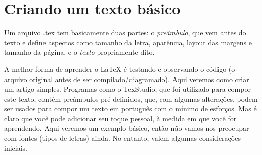 \documentclass[a4paper,nols,bidi]{tufte-book}
\begin{document}
\chapter{Criando um texto básico}

Um arquivo .tex tem basicamente duas partes: o \textit{preâmbulo}, que vem antes do texto e define aspectos como tamanho da letra, aparência, layout das margens e tamanho da página, e o \textit{texto} propriamente dito.

A melhor forma de aprender o \LaTeX{} é testando e observando o código (o arquivo original antes de ser compilado/diagramado). Aqui veremos como criar um artigo simples. Programas como o TexStudio, que foi utilizado para compor este texto, contêm preâmbulos pré-definidos, que, com algumas alterações, podem ser usados para compor um texto em português com o mínimo de esforços. Mas é claro que você pode adicionar seu toque pessoal, à medida em que você for aprendendo. Aqui veremos um exemplo básico, então não vamos nos preocupar com fontes (tipos de letras) ainda. No entanto, valem algumas considerações iniciais.

%
%
%
%
\end{document}
